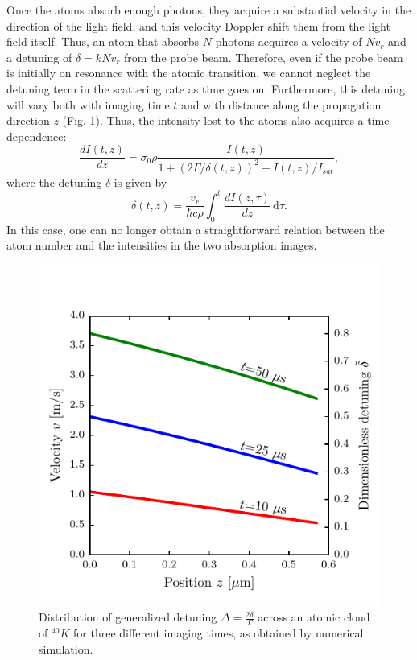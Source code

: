 \documentclass[12pt]{iopart}
\begin{document}
\par Once the atoms absorb enough photons, they acquire a substantial velocity in the direction of the light field, and this velocity Doppler shift them from the light field itself. Thus, an atom that absorbs $N$ photons acquires a velocity of $N v_r$ and a detuning of $\delta=k N v_r$ from the probe beam. Therefore, even if the probe beam is initially on resonance with the atomic transition, we cannot neglect the detuning term in the scattering rate as time goes on. Furthermore, this detuning will vary both with imaging time $t$ and with distance along the propagation direction $z$ (Fig. \ref{fig:detunedBlobs}). Thus, the intensity lost to the atoms also acquires a time dependence: 
\begin{equation}
\frac{dI(t,z)}{dz}=\sigma_0 \rho \frac{I(t,z)}{1+(2\Gamma/\delta(t,z))^2 +I(t,z)/I_{sat}}, \label{eq3}
\end{equation}
where the detuning $\delta$ is given by 
\begin{equation}
\delta(t,z)=\frac{v_r}{\hbar c \rho}\int_0^t \frac{dI(z,\tau)}{dz}\,\mathrm{d}\tau. \label{eq4} 
\end{equation}
In this case, one can no longer obtain a straightforward relation between the atom number and the intensities in the two absorption images.
\begin{figure}
	\includegraphics*{figure1.pdf}
\caption{Distribution of generalized detuning $\Delta=\frac{2\delta}{\Gamma}$ across an atomic cloud of $^{40}K$ for three different imaging times, as obtained by numerical simulation.}  
\label{fig:detunedBlobs}
\end{figure}
\end{document}
